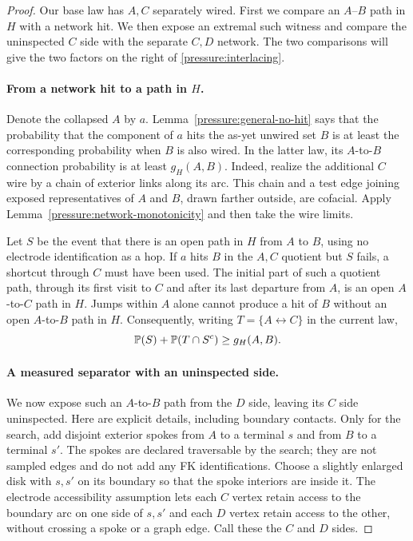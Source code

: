 \begin{proof}
Our base law has $A,C$ separately wired. First we compare an
$A$--$B$ path in $H$ with a network hit. We then expose
an extremal such witness and compare the uninspected $C$ side with
the separate $C,D$ network. The two comparisons will give the two
factors on the right of \eqref{pressure:interlacing}.

\paragraph{From a network hit to a path in $H$.}
Denote the collapsed $A$ by $a$. Lemma~\ref{pressure:general-no-hit} says that the
probability that the component of $a$ hits the as-yet unwired set
$B$ is at least the corresponding probability when $B$ is also
wired. In the latter law, its $A$-to-$B$ connection probability is
at least $g_H(A,B)$. Indeed, realize the additional $C$ wire by a
chain of exterior links along its arc. This chain and a test edge
joining exposed representatives of $A$ and $B$, drawn farther
outside, are cofacial. Apply
Lemma~\ref{pressure:network-monotonicity} and then take the wire
limits.

Let $S$ be the event that there is an open path in $H$ from
$A$ to $B$, using no electrode identification as a hop. If $a$ hits $B$
in the $A,C$ quotient but $S$ fails, a shortcut through $C$ must have
been used. The initial part of such a quotient path, through its
first visit to $C$ and after its last departure from $A$, is an
open $A$-to-$C$ path in $H$. Jumps within $A$ alone cannot produce
a hit of $B$ without an open $A$-to-$B$ path in $H$. Consequently, writing
$T=\{A\leftrightarrow C\}$ in the current law,
\begin{equation}
 \mathbb P(S)+\mathbb P(T\cap S^c)\ge g_H(A,B).
 \label{pressure:physical-hit}
\end{equation}

\paragraph{A measured separator with an uninspected side.}
We now expose such an $A$-to-$B$ path from the $D$ side, leaving
its $C$ side uninspected. Here are explicit details, including
boundary contacts. Only for the search, add disjoint exterior spokes
from $A$ to a terminal $s$ and from $B$ to a terminal $s'$. The
spokes are declared traversable by the search; they are not sampled
edges and do not add any FK identifications. Choose a slightly
enlarged disk with $s,s'$ on its boundary so that the spoke interiors
are inside it. The electrode accessibility assumption lets each
$C$ vertex retain access to the boundary arc on one side of $s,s'$
and each $D$ vertex retain access to the other, without crossing a
spoke or a graph edge. Call these the $C$ and $D$ sides.


\end{proof}
